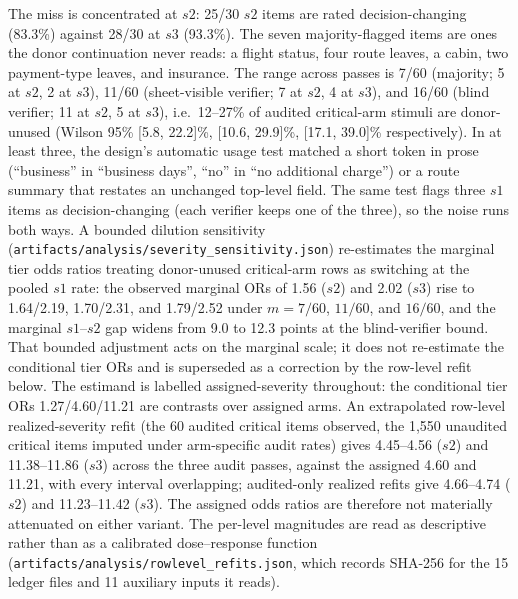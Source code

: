 \documentclass[a4paper,fleqn]{cas-sc}
\begin{document}
The miss is concentrated at $s2$: 25/30 $s2$ items are rated decision-changing (83.3\%) against
28/30 at $s3$ (93.3\%). The seven majority-flagged items are ones the donor continuation never
reads: a flight status, four route leaves, a cabin, two payment-type leaves, and insurance. The
range across passes is 7/60 (majority; 5 at $s2$, 2 at $s3$), 11/60 (sheet-visible verifier;
7 at $s2$, 4 at $s3$), and 16/60 (blind verifier; 11 at $s2$, 5 at $s3$), i.e.\ 12--27\% of
audited critical-arm stimuli are donor-unused (Wilson 95\% [5.8, 22.2]\%, [10.6, 29.9]\%,
[17.1, 39.0]\% respectively). In at least
three, the design's automatic usage test matched a short token in prose (``business'' in
``business days'', ``no'' in ``no additional charge'') or a route summary that restates an
unchanged top-level field. The same test flags three $s1$ items as decision-changing (each
verifier keeps one of the three), so the
noise runs both ways. A bounded dilution sensitivity
(\texttt{artifacts/analysis/severity\_sensitivity.json}) re-estimates the marginal tier odds
ratios treating donor-unused critical-arm rows as switching at the pooled $s1$ rate: the
observed marginal ORs of 1.56 ($s2$) and 2.02 ($s3$) rise to 1.64/2.19, 1.70/2.31, and
1.79/2.52 under $m=7/60$, $11/60$, and $16/60$, and the marginal $s1$--$s2$ gap widens from
9.0 to 12.3 points at the blind-verifier bound. That bounded adjustment acts on the marginal
scale; it does not re-estimate the conditional tier ORs and is superseded as a correction by the
row-level refit below. The estimand is labelled assigned-severity throughout: the conditional tier
ORs 1.27/4.60/11.21 are contrasts over assigned arms. An extrapolated row-level realized-severity
refit (the 60 audited critical items observed, the 1{,}550 unaudited critical items imputed under
arm-specific audit rates) gives 4.45--4.56 ($s2$) and 11.38--11.86 ($s3$) across the three audit
passes, against the assigned 4.60 and 11.21, with every interval overlapping; audited-only realized
refits give 4.66--4.74 ($s2$) and 11.23--11.42 ($s3$). The assigned odds ratios are therefore not
materially attenuated on either variant. The
per-level magnitudes are read as descriptive rather than as a calibrated dose--response function
(\texttt{artifacts/analysis/rowlevel\_refits.json}, which records SHA-256 for the 15 ledger files
and 11 auxiliary inputs it reads).
\end{document}
